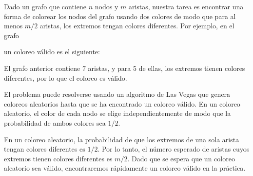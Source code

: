 Dado un grafo que contiene $n$ nodos y $m$ aristas,
nuestra tarea es encontrar una forma de colorear los nodos
del grafo usando dos colores de modo que
para al menos $m/2$ aristas, los extremos
tengan colores diferentes.
Por ejemplo, en el grafo
\begin{center}
\end{center}
un coloreo válido es el siguiente:
\begin{center}
\end{center}
El grafo anterior contiene 7 aristas, y para 5 de ellas,
los extremos tienen colores diferentes,
por lo que el coloreo es válido.

El problema puede resolverse usando un algoritmo de Las Vegas
que genera coloreos aleatorios hasta que se ha encontrado un coloreo válido.
En un coloreo aleatorio, el color de cada nodo se
elige independientemente de modo que la probabilidad de
ambos colores sea $1/2$.

En un coloreo aleatorio, la probabilidad de que los extremos
de una sola arista tengan colores diferentes es $1/2$.
Por lo tanto, el número esperado de aristas cuyos extremos
tienen colores diferentes es $m/2$.
Dado que se espera que un coloreo aleatorio sea válido,
encontraremos rápidamente un coloreo válido en la práctica.

